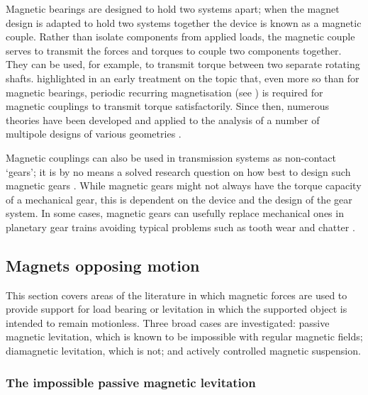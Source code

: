 \documentclass[11pt,a4paper]{memoir}
\begin{document}
Magnetic bearings are designed to hold two systems apart; when the magnet design is adapted to hold two systems together the device is known as a magnetic couple.
Rather than isolate components from applied loads, the magnetic couple serves to transmit the forces and torques to couple two components together.
They can be used, for example, to transmit torque between two separate rotating shafts.
\textcite{yonnet1981} highlighted in an early treatment on the topic that, even more so than for magnetic bearings, periodic recurring magnetisation (see ) is required for magnetic couplings to transmit torque satisfactorily.
Since then, numerous theories have been developed and applied to the analysis of a number of multipole designs of various geometries \cite{charpentier1999-ietm-mar,charpentier1999-ietm-sep,charpentier2001-compel,chen2003,ravaud2009-coupling-3d,ravaud2010-ietm-coupling}.

Magnetic couplings can also be used in transmission systems as non-contact `gears'; it is by no means a solved research question on how best to design such magnetic gears
\cite{rens2010-ietia}.
While magnetic gears might not always have the torque capacity of a mechanical gear, this is dependent on the device and the design of the gear system.
In some cases, magnetic gears can usefully replace mechanical ones in planetary gear trains avoiding typical problems such as tooth wear and chatter
\cite{gouda2011-ietm}.


\subsection{Magnets opposing motion}

This section covers areas of the literature in which magnetic forces are used to provide support for load bearing or levitation in which the supported object is intended to remain motionless.
Three broad cases are investigated: passive magnetic levitation, which is known to be impossible with regular magnetic fields; diamagnetic levitation, which is not; and actively controlled magnetic suspension.

\subsubsection{The impossible passive magnetic levitation}
\end{document}
